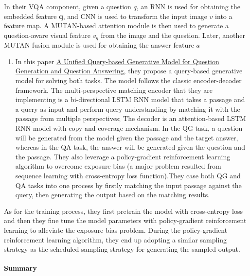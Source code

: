 \documentclass[]{book}
\providecommand{\tightlist}{%
  \setlength{\itemsep}{0pt}\setlength{\parskip}{0pt}}
\let\oldparagraph\paragraph
\renewcommand{\paragraph}[1]{\oldparagraph{#1}\mbox{}}
\theoremstyle{definition}
\theoremstyle{definition}
\theoremstyle{definition}
\theoremstyle{remark}
\begin{document}
In their VQA component, given a question \(q\), an RNN is used for
obtaining the embedded feature \textbf{q}, and CNN is used to transform
the input image \(v\) into a feature map. A MUTAN-based attention module
is then used to generate a question-aware visual feature \(v_q\) from
the image and the question. Later, another MUTAN fusion module is used
for obtaining the answer feature \(a\hat{}\)

\begin{enumerate}
\def\labelenumi{\arabic{enumi}.}
\setcounter{enumi}{3}
\tightlist
\item
  In this paper \href{https://arxiv.org/pdf/1709.01058.pdf}{A Unified
  Query-based Generative Model for Question Generation and Question
  Answering}, they propose a query-based generative model for solving
  both tasks. The model follows the classic encoder-decoder framework.
  The multi-perspective matching encoder that they are implementing is a
  bi-directional LSTM RNN model that takes a passage and a query as
  input and perform query understanding by matching it with the passage
  from multiple perspectives; The decoder is an attention-based LSTM RNN
  model with copy and coverage mechanism. In the QG task, a question
  will be generated from the model given the passage and the target
  answer, whereas in the QA task, the answer will be generated given the
  question and the passage. They also leverage a policy-gradient
  reinforcement learning algorithm to overcome exposure bias (a major
  problem resulted from sequence learning with cross-entropy loss
  function).They case both QG and QA tasks into one process by firstly
  matching the input passage against the query, then generating the
  output based on the matching results.
\end{enumerate}

As for the training process, they first pretrain the model with
cross-entropy loss and then they fine tune the model parameters with
policy-gradient reinforcement learning to alleviate the exposure bias
problem. During the policy-gradient reinforcement learning algorithm,
they end up adopting a similar sampling strategy as the scheduled
sampling strategy for generating the sampled output.

\paragraph{Summary}\label{summary-2}
\end{document}
